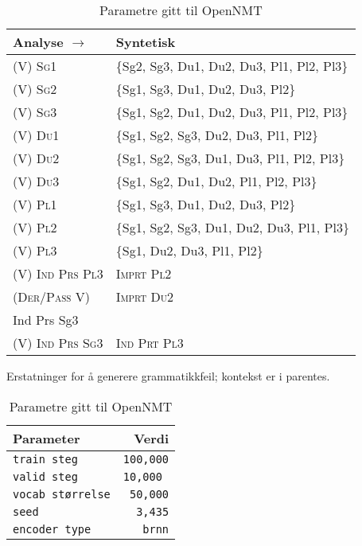 \documentclass{flammie}
\begin{document}
\begin{table}[htb]
\begin{minipage}{0.63\textwidth}
    \begin{tabular}{l|l}
        \hline
         \textbf{Analyse} $\rightarrow$ & \textbf{Syntetisk} \\
         \hline
         \textsc{(V) Sg1} & \{Sg2, Sg3, Du1, Du2, Du3, Pl1, Pl2, Pl3\}  \\
         \textsc{(V) Sg2} & \{Sg1, Sg3, Du1, Du2, Du3, Pl2\}  \\
         \textsc{(V) Sg3} & \{Sg1, Sg2, Du1, Du2, Du3, Pl1, Pl2, Pl3\}  \\
         \textsc{(V) Du1} & \{Sg1, Sg2, Sg3, Du2, Du3, Pl1, Pl2\}  \\
         \textsc{(V) Du2} & \{Sg1, Sg2, Sg3, Du1, Du3, Pl1, Pl2, Pl3\}  \\
         \textsc{(V) Du3} & \{Sg1, Sg2, Du1, Du2, Pl1, Pl2, Pl3\}  \\
         \textsc{(V) Pl1} & \{Sg1, Sg3, Du1, Du2, Du3, Pl2\}  \\
         \textsc{(V) Pl2} & \{Sg1, Sg2, Sg3, Du1, Du2, Du3, Pl1, Pl3\}  \\
         \textsc{(V) Pl3} & \{Sg1, Du2, Du3, Pl1, Pl2\}  \\
         \hline
         \textsc{(V) Ind Prs Pl3} & \textsc{Imprt Pl2} \\
         \textsc{(Der/Pass V)} & \textsc{Imprt Du2} \\
         {Ind Prs Sg3} &  \\
         \textsc{(V) Ind Prs Sg3} & \textsc{Ind Prt Pl3} \\
         \hline
    \end{tabular}
    \caption{Erstatninger for å generere grammatikkfeil; kontekst er i parentes.
    \label{table:ersetzt}}
    \end{minipage}
    \begin{minipage}{0.28\textwidth}
   \begin{tabular}{l|r}
   \hline
   \bf Parameter & \bf Verdi \\
   \hline
        \texttt{train steg} & \texttt{100,000} \\
        \texttt{valid steg} & \texttt{10,000 }\\
        \texttt{vocab størrelse} & \texttt{50,000} \\
        \texttt{seed} & \texttt{3,435} \\
        \texttt{encoder type} & \texttt{brnn} \\
        \hline
   \end{tabular}
   \caption{Parametre gitt til OpenNMT}\label{table:params}
    \end{minipage}
\end{table}
\end{document}
